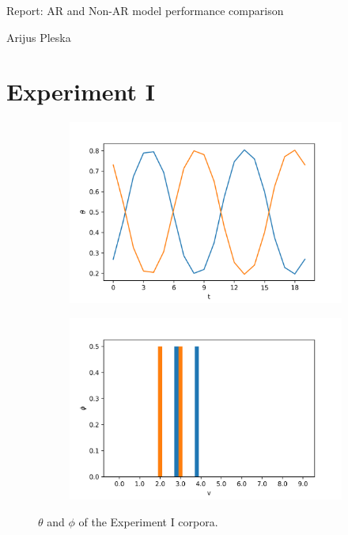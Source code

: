 \documentclass[12pt]{article}
\begin{document}
\begingroup  
  \centering
  \large Report: AR and Non-AR model performance comparison \par
  \large Arijus Pleska \par
\endgroup

\section*{Experiment I}

\begin{figure}[H]
  \centering
  \begin{subfigure}[b]{0.4\textwidth}
    \includegraphics[width=\linewidth]{init_theta-1.png}
  \end{subfigure}%
  \begin{subfigure}[b]{0.4\textwidth}
    \includegraphics[width=\linewidth]{init_phi-1.png}
  \end{subfigure}%
  \caption{$\theta$ and $\phi$ of the Experiment I corpora.}
\end{figure}
\end{document}
